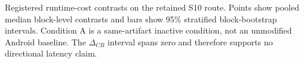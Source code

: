 \caption{Registered runtime-cost contrasts on the retained S10 route. Points show pooled median block-level contrasts and bars show 95\% stratified block-bootstrap intervals. Condition A is a same-artifact inactive condition, not an unmodified Android baseline. The $\Delta_{CB}$ interval spans zero and therefore supports no directional latency claim.}
